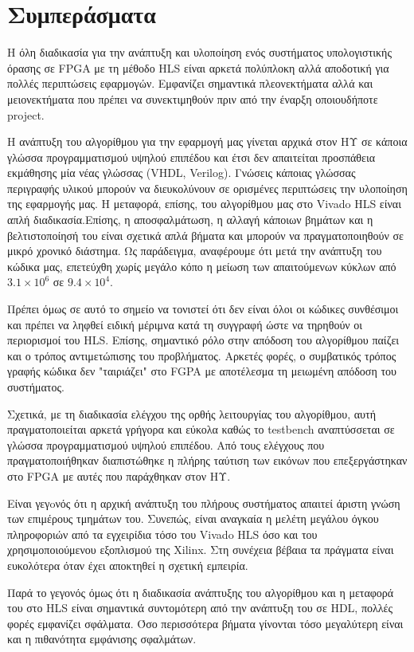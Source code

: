 \section{Συμπεράσματα}

Η όλη διαδικασία για την ανάπτυξη και υλοποίηση ενός συστήματος υπολογιστικής όρασης σε FPGA με τη μέθοδο HLS είναι αρκετά πολύπλοκη αλλά αποδοτική για πολλές περιπτώσεις εφαρμογών. Εμφανίζει σημαντικά πλεονεκτήματα αλλά και μειονεκτήματα που πρέπει να συνεκτιμηθούν πριν από την έναρξη οποιουδήποτε project.

Η ανάπτυξη του αλγορίθμου για την εφαρμογή μας γίνεται αρχικά στον ΗΥ σε κάποια γλώσσα προγραμματισμού υψηλού επιπέδου και έτσι δεν απαιτείται προσπάθεια εκμάθησης μία νέας γλώσσας (VHDL, Verilog). Γνώσεις κάποιας γλώσσας περιγραφής υλικού μπορούν να διευκολύνουν σε ορισμένες περιπτώσεις την υλοποίηση της εφαρμογής μας. Η μεταφορά, επίσης, του αλγορίθμου μας στο Vivado HLS είναι απλή διαδικασία.Επίσης, η αποσφαλμάτωση, η αλλαγή κάποιων βημάτων και η βελτιστοποίησή του είναι σχετικά απλά βήματα και μπορούν να πραγματοποιηθούν σε μικρό χρονικό διάστημα. Ως παράδειγμα, αναφέρουμε ότι μετά την ανάπτυξη του κώδικα μας, επετεύχθη χωρίς μεγάλο κόπο η μείωση των απαιτούμενων κύκλων από $3.1\times 10^6$ σε $9.4\times 10^4$.

Πρέπει όμως σε αυτό το σημείο να τονιστεί ότι δεν είναι όλοι οι κώδικες συνθέσιμοι και πρέπει να ληφθεί ειδική μέριμνα κατά τη συγγραφή ώστε να τηρηθούν οι περιορισμοί του HLS.
Επίσης, σημαντικό ρόλο στην απόδοση του αλγορίθμου παίζει και ο τρόπος αντιμετώπισης του προβλήματος. Αρκετές φορές, ο συμβατικός τρόπος γραφής κώδικα δεν "ταιριάζει" στο FGPA με αποτέλεσμα τη μειωμένη απόδοση του συστήματος.

Σχετικά, με τη διαδικασία ελέγχου της ορθής λειτουργίας του αλγορίθμου, αυτή πραγματοποιείται αρκετά γρήγορα και εύκολα καθώς το testbench αναπτύσσεται σε γλώσσα προγραμματισμού υψηλού επιπέδου. Από τους ελέγχους που πραγματοποιήθηκαν διαπιστώθηκε η πλήρης ταύτιση των εικόνων που επεξεργάστηκαν στο FPGA με αυτές που παράχθηκαν στον ΗΥ.

Είναι γεγoνός ότι η αρχική ανάπτυξη του πλήρους συστήματος απαιτεί άριστη γνώση των επιμέρους τμημάτων του. Συνεπώς, είναι αναγκαία η μελέτη μεγάλου όγκου πληροφοριών από τα εγχειρίδια τόσο του Vivado HLS όσο και του χρησιμοποιούμενου εξοπλισμού της Xilinx. Στη συνέχεια βέβαια τα πράγματα είναι ευκολότερα όταν έχει αποκτηθεί η σχετική εμπειρία.

Παρά το γεγονός όμως ότι η διαδικασία ανάπτυξης του αλγορίθμου και η μεταφορά του στο HLS είναι σημαντικά συντομότερη από την ανάπτυξη του σε HDL, πολλές φορές εμφανίζει σφάλματα. Όσο περισσότερα βήματα γίνονται τόσο μεγαλύτερη είναι και η πιθανότητα εμφάνισης σφαλμάτων.

